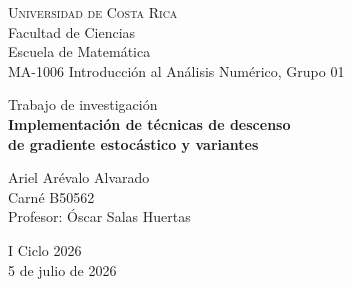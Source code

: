 \onecolumn
\thispagestyle{empty}
\begin{center}
    \vspace*{2.5cm}

    {\Large \textsc{Universidad de Costa Rica}}\\[0.6em]
    {\large Facultad de Ciencias}\\[0.4em]
    {\large Escuela de Matemática}\\[0.4em]
    {\large MA-1006 Introducción al Análisis Numérico, Grupo 01}

    \vfill

    {\large Trabajo de investigación}\\[1.2em]
    {\LARGE\bfseries Implementación de técnicas de descenso\\[0.35em]
    de gradiente estocástico y variantes}

    \vfill

    {\large Ariel Arévalo Alvarado}\\[0.4em]
    {\large Carné B50562}\\[2em]
    {\large Profesor: Óscar Salas Huertas}

    \vfill

    {\large I Ciclo 2026}\\[0.4em]
    {\large 5 de julio de 2026}

    \vspace*{1.5cm}
\end{center}
\twocolumn
\setcounter{page}{1}
